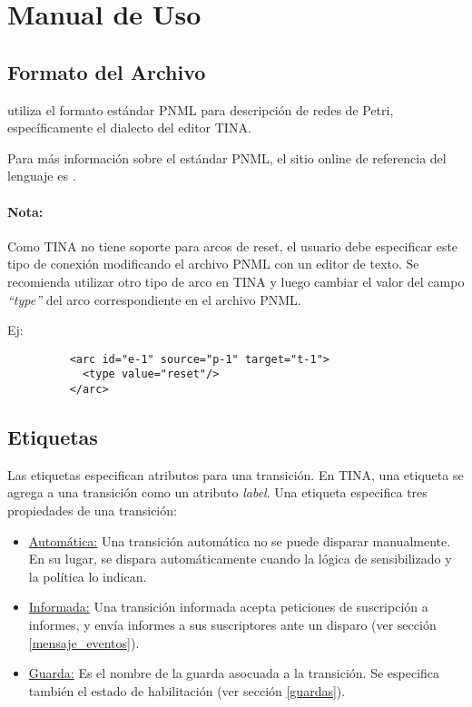 \section{Manual de Uso}

\subsection{Formato del Archivo}

\javapetriconcurrencymonitor utiliza el formato estándar PNML para descripción
de redes de Petri, específicamente el dialecto del editor TINA\cite{TinaSite}.

Para más información sobre el estándar PNML, el sitio online de referencia del
lenguaje es \cite{PnmlSite}.

\begin{framed}
    \paragraph{Nota:}
    Como TINA no tiene soporte para arcos de reset, el usuario debe especificar
    este tipo de conexión modificando el archivo PNML con un editor de texto.
    Se recomienda utilizar otro tipo de arco en TINA y luego cambiar el valor del
    campo \textit{``type''} del arco correspondiente en el archivo PNML.
    
    Ej:
    \begin{figure}[H]
    \centering
    \begin{verbatim}
    <arc id="e-1" source="p-1" target="t-1">
      <type value="reset"/>
    </arc>
    \end{verbatim}
    \end{figure}
\end{framed}

\subsection{Etiquetas}

Las etiquetas especifican atributos para una transición. En TINA, una etiqueta
se agrega a una transición como un atributo \textit{label}.
Una etiqueta especifica tres propiedades de una transición:

\begin{itemize}
    \item \underline{Automática:} Una transición automática no se puede disparar
    manualmente. En su lugar, se dispara automáticamente cuando la lógica de
    sensibilizado y la política lo indican.
    \item \underline{Informada:} Una transición informada acepta peticiones de
    suscripción a informes, y envía informes a sus suscriptores ante un disparo
    (ver sección \ref{mensaje_eventos}).
    \item \underline{Guarda:} Es el nombre de la guarda asocuada a la
    transición. Se especifica también el estado de habilitación (ver sección
    \ref{guardas}).
\end{itemize}

